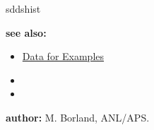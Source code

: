 \begin{sddsprog}{sddshist}
\begin{itemize}
    \end{itemize}
  \item \textbf{see also:}
    \begin{itemize}
      \item \hyperref[exampleData]{Data for Examples}
      \item {}
      \item {}
    \end{itemize}
  \item \textbf{author:} M. Borland, ANL/APS.
\end{sddsprog}

